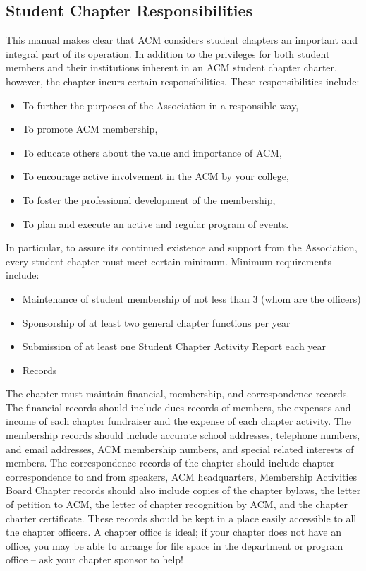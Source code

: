\subsection{Student Chapter Responsibilities}
This manual makes clear that ACM considers student chapters an important and integral part of its operation. In addition to the privileges for both student members and their institutions inherent in an ACM student chapter charter, however, the chapter incurs certain responsibilities. These responsibilities include:
	\begin{itemize}
		\item To further the purposes of the Association in a responsible way,
		\item To promote ACM membership,
		\item To educate others about the value and importance of ACM,
		\item To encourage active involvement in the ACM by your college,
		\item To foster the professional development of the membership,
		\item To plan and execute an active and regular program of events.
	\end{itemize}
In particular, to assure its continued existence and support from the Association, every student chapter must meet certain minimum. Minimum requirements include:
	\begin{itemize}
		\item Maintenance of student membership of not less than 3 (whom are the officers)
		\item Sponsorship of at least two general chapter functions per year
		\item Submission of at least one Student Chapter Activity Report each year
		\item Records
	\end{itemize}
The chapter must maintain financial, membership, and correspondence records. The financial records should include dues records of members, the expenses and income of each chapter fundraiser and the expense of each chapter activity. The membership records should include accurate school addresses, telephone numbers, and email addresses, ACM membership numbers, and special related interests of members. The correspondence records of the chapter should include chapter correspondence to and from speakers, ACM headquarters, Membership Activities Board Chapter records should also include copies of the chapter bylaws, the letter of petition to ACM, the letter of chapter recognition by ACM, and the chapter charter certificate. These records should be kept in a place easily accessible to all the chapter officers. A chapter office is ideal; if your chapter does not have an office, you may be able to arrange for file space in the department or program office -- ask your chapter sponsor to help!

